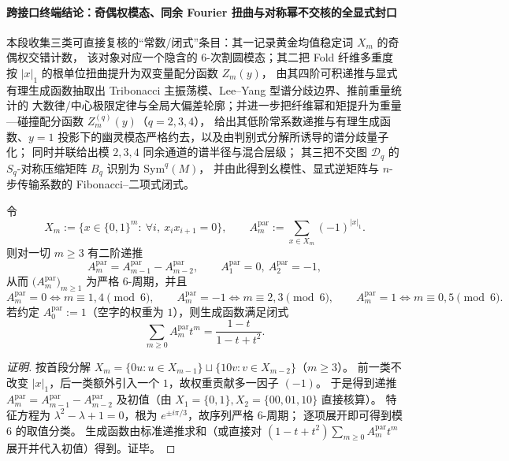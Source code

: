 \paragraph{跨接口终端结论：奇偶权模态、同余 Fourier 扭曲与对称幂不交核的全显式封口}
本段收集三类可直接复核的“常数/闭式”条目：其一记录黄金均值稳定词 \(X_m\) 的奇偶权交错计数，
该对象对应一个隐含的 \(6\)-次割圆模态；其二把 Fold 纤维多重度按 \(|x|_1\) 的根单位扭曲提升为双变量配分函数 \(Z_m(y)\)，
由其四阶可积递推与显式有理生成函数抽取出 Tribonacci 主振荡模、Lee--Yang 型谱分歧边界、推前重量统计的
大数律/中心极限定律与全局大偏差轮廓；并进一步把纤维幂和矩提升为重量—碰撞配分函数 \(Z_m^{(q)}(y)\)（\(q=2,3,4\)），
给出其低阶常系数递推与有理生成函数、\(y=1\) 投影下的幽灵模态严格约去，以及由判别式分解所诱导的谱分歧量子化；
同时并联给出模 \(2,3,4\) 同余通道的谱半径与混合层级；
其三把不交图 \(\mathcal D_q\) 的 \(S_q\)-对称压缩矩阵 \(B_q\) 识别为 \(\mathrm{Sym}^q(M)\)，
并由此得到幺模性、显式逆矩阵与 \(n\)-步传输系数的 Fibonacci--二项式闭式。

\begin{conclusion}\label{con:xi-terminal-xm-parity-weight-6period}
令
\[
X_m:=\{x\in\{0,1\}^m:\ \forall i,\ x_ix_{i+1}=0\},
\qquad
A_m^{\mathrm{par}}:=\sum_{x\in X_m}(-1)^{|x|_1}.
\]
则对一切 \(m\ge 3\) 有二阶递推
\[
A_m^{\mathrm{par}}=A_{m-1}^{\mathrm{par}}-A_{m-2}^{\mathrm{par}},
\qquad
A_1^{\mathrm{par}}=0,\ A_2^{\mathrm{par}}=-1,
\]
从而 \(\bigl(A_m^{\mathrm{par}}\bigr)_{m\ge 1}\) 为严格 \(6\)-周期，并且
\[
A_m^{\mathrm{par}}=0\iff m\equiv 1,4\pmod 6,\qquad
A_m^{\mathrm{par}}=-1\iff m\equiv 2,3\pmod 6,\qquad
A_m^{\mathrm{par}}=1\iff m\equiv 0,5\pmod 6.
\]
若约定 \(A_0^{\mathrm{par}}:=1\)（空字的权重为 \(1\)），则生成函数满足闭式
\[
\sum_{m\ge 0}A_m^{\mathrm{par}}t^m=\frac{1-t}{1-t+t^2}.
\]
\end{conclusion}
\begin{proof}[证明]
按首段分解 \(X_m=\{0u:u\in X_{m-1}\}\sqcup \{10v:v\in X_{m-2}\}\)（\(m\ge 3\)）。
前一类不改变 \(|x|_1\)，后一类额外引入一个 \(1\)，故权重贡献多一因子 \((-1)\)。
于是得到递推
\(
A_m^{\mathrm{par}}=A_{m-1}^{\mathrm{par}}-A_{m-2}^{\mathrm{par}}
\)
及初值（由 \(X_1=\{0,1\},X_2=\{00,01,10\}\) 直接核算）。
特征方程为 \(\lambda^2-\lambda+1=0\)，根为 \(e^{\pm i\pi/3}\)，故序列严格 \(6\)-周期；
逐项展开即可得到模 \(6\) 的取值分类。
生成函数由标准递推求和（或直接对 \((1-t+t^2)\sum_{m\ge 0}A_m^{\mathrm{par}}t^m\) 展开并代入初值）得到。证毕。
\end{proof}











